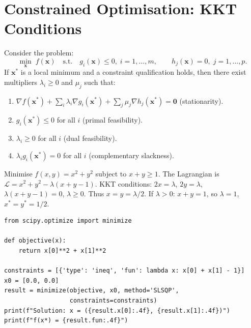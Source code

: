\section{Constrained Optimisation: KKT Conditions}
\label{sec:kkt}

\begin{theorem}
Consider the problem:
\[
  \min_{\mathbf{x}}\;f(\mathbf{x})
  \quad\text{s.t.}\quad
  g_i(\mathbf{x})\leq 0,\;i=1,\ldots,m, \qquad
  h_j(\mathbf{x})=0,\;j=1,\ldots,p.
\]
If $\mathbf{x}^*$ is a local minimum and a constraint qualification
holds, then there exist multipliers $\lambda_i\geq 0$ and $\mu_j$
such that:
\begin{enumerate}
  \item $\nabla f(\mathbf{x}^*) + \sum_i\lambda_i\nabla g_i(\mathbf{x}^*)
    + \sum_j\mu_j\nabla h_j(\mathbf{x}^*) = \mathbf{0}$ (stationarity).
  \item $g_i(\mathbf{x}^*)\leq 0$ for all $i$ (primal feasibility).
  \item $\lambda_i\geq 0$ for all $i$ (dual feasibility).
  \item $\lambda_i g_i(\mathbf{x}^*)=0$ for all $i$
    (complementary slackness).
\end{enumerate}
\end{theorem}

\begin{example}
Minimise $f(x,y)=x^2+y^2$ subject to $x+y\geq 1$.
The Lagrangian is $\mathcal{L}=x^2+y^2-\lambda(x+y-1)$.
KKT conditions: $2x=\lambda$, $2y=\lambda$, $\lambda(x+y-1)=0$,
$\lambda\geq 0$.  Thus $x=y=\lambda/2$.  If $\lambda>0$: $x+y=1$,
so $\lambda=1$, $x^*=y^*=1/2$.
\end{example}

\begin{codeblock}[title=\textbf{Constrained optimisation with \texttt{scipy}}]
\begin{verbatim}
from scipy.optimize import minimize

def objective(x):
    return x[0]**2 + x[1]**2

constraints = [{'type': 'ineq', 'fun': lambda x: x[0] + x[1] - 1}]
x0 = [0.0, 0.0]
result = minimize(objective, x0, method='SLSQP',
                  constraints=constraints)
print(f"Solution: x = ({result.x[0]:.4f}, {result.x[1]:.4f})")
print(f"f(x*) = {result.fun:.4f}")
\end{verbatim}
\end{codeblock}

